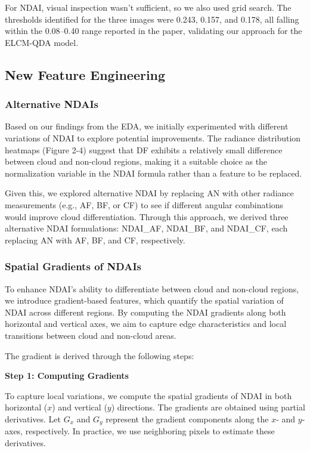 \documentclass[10pt,letterpaper]{article}
\begin{document}
For NDAI, visual inspection wasn’t sufficient, so we also used grid search. The thresholds identified for the three images were 0.243, 0.157, and 0.178, all falling within the 0.08–0.40 range reported in the paper, validating our approach for the ELCM-QDA model.


\subsection{New Feature Engineering}

\subsubsection{Alternative NDAIs}

Based on our findings from the EDA, we initially experimented with different variations of NDAI to explore potential improvements. The radiance distribution heatmaps (Figure 2-4) suggest that DF exhibits a relatively small difference between cloud and non-cloud regions, making it a suitable choice as the normalization variable in the NDAI formula rather than a feature to be replaced.

Given this, we explored alternative NDAI by replacing AN with other radiance measurements (e.g., AF, BF, or CF) to see if different angular combinations would improve cloud differentiation. Through this approach, we derived three alternative NDAI formulations: NDAI\_AF, NDAI\_BF, and NDAI\_CF, each replacing AN with AF, BF, and CF, respectively. 

\subsubsection{Spatial Gradients of NDAIs}

To enhance NDAI's ability to differentiate between cloud and non-cloud regions, we introduce gradient-based features, which quantify the spatial variation of NDAI across different regions. By computing the NDAI gradients along both horizontal and vertical axes, we aim to capture edge characteristics and local transitions between cloud and non-cloud areas.

The gradient is derived through the following steps:

\textbf{Step 1: Computing Gradients}  

To capture local variations, we compute the spatial gradients of NDAI in both horizontal (\( x \)) and vertical (\( y \)) directions. The gradients are obtained using partial derivatives. Let \( G_x \) and \( G_y \) represent the gradient components along the \( x \)- and \( y \)-axes, respectively. In practice, we use neighboring pixels to estimate these derivatives.
\end{document}

